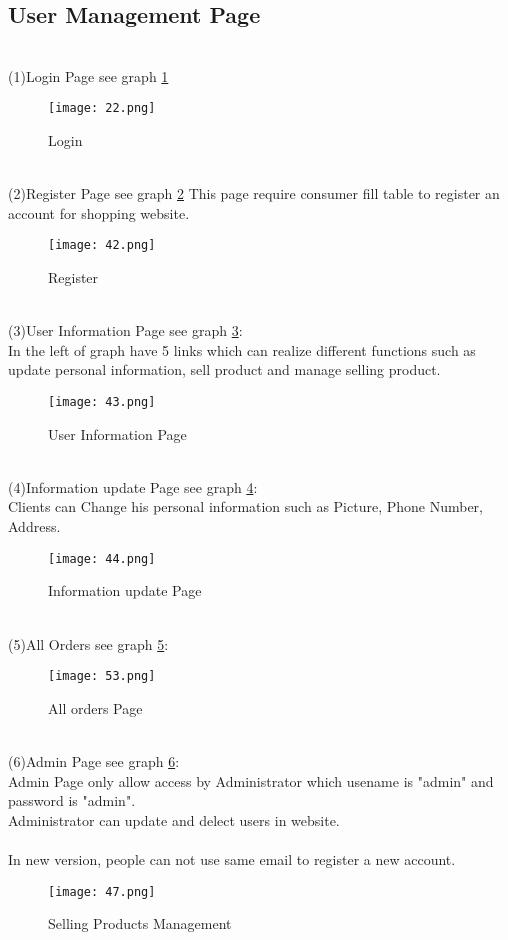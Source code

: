 \subsection{User Management Page}
\\
(1)Login Page see graph \ref{fig:21 cubed graph}
\\
\begin{figure}[h]
	\centering
	\texttt{[image: 22.png]}
	\caption{Login}
	\label{fig:21 cubed graph}
\end{figure}
\\
(2)Register Page see graph \ref{fig:22 cubed graph}
This page require consumer fill table to register an account for shopping website.\\
\begin{figure}[h]
	\centering
	\texttt{[image: 42.png]}
	\caption{Register}
	\label{fig:22 cubed graph}
\end{figure}
\\
(3)User Information Page see graph \ref{fig:23 cubed graph}:
\\ 
In the left of graph have 5 links which can realize different functions such as update personal information, sell product and manage selling product.\\ 
\begin{figure}[h]
	\centering
	\texttt{[image: 43.png]}
	\caption{User Information Page}
	\label{fig:23 cubed graph}
\end{figure}
\\
(4)Information update Page see graph \ref{fig:24 cubed graph}:
\\
Clients can Change his personal information such as Picture, Phone Number, Address.\\ 
 \begin{figure}[h]
 	\centering
 	\texttt{[image: 44.png]}
 	\caption{Information update Page}
 	\label{fig:24 cubed graph}
 \end{figure}
 \\
(5)All Orders see graph \ref{fig:ooo cubed graph}:
\\ 
\begin{figure}[h]
	\centering
	\texttt{[image: 53.png]}
	\caption{All orders Page}
	\label{fig:ooo cubed graph}
\end{figure}
\\
(6)Admin Page see graph \ref{fig:27 cubed graph}:
\\
Admin Page only allow access by Administrator which usename is "admin" and password is "admin".\\
Administrator can update and delect users in website.\\ 
\\
In new version, people can not use same email to register a new account.
  \begin{figure}[h]
  	\centering
  	\texttt{[image: 47.png]}
  	\caption{Selling Products Management}
  	\label{fig:27 cubed graph}
  \end{figure}
\\
